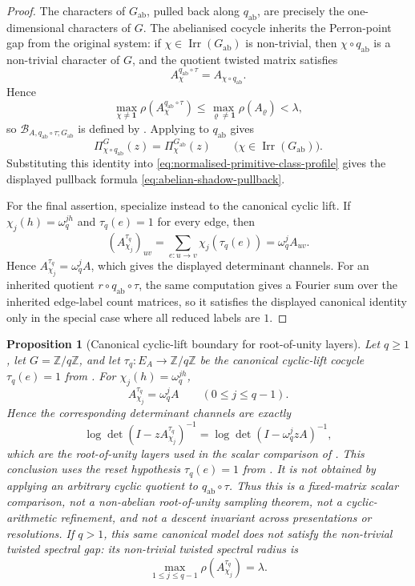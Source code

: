 \documentclass[11pt,a4paper]{amsart}
\theoremstyle{plain}
\newtheorem{proposition}[theorem]{Proposition}
\theoremstyle{definition}
\theoremstyle{remark}
\DeclareMathOperator{\Irr}{Irr}
\newcommand{\ZZ}{\mathbb{Z}}
\begin{document}
\begin{proof}
  The characters of \(G_{\mathrm{ab}}\), pulled back along
  \(q_{\mathrm{ab}}\), are precisely the one-dimensional characters of
  \(G\). The abelianised cocycle inherits the Perron-point gap from the
  original system:
  if \(\chi\in\Irr(G_{\mathrm{ab}})\) is non-trivial, then
  \(\chi\circ q_{\mathrm{ab}}\) is a non-trivial character of \(G\), and
  the quotient twisted matrix satisfies
  \[
    A_{\chi}^{q_{\mathrm{ab}}\circ\tau}
    =
    A_{\chi\circ q_{\mathrm{ab}}}.
  \]
  Hence
  \[
    \max_{\chi\neq\mathbf 1}
      \rho\!\left(A_{\chi}^{q_{\mathrm{ab}}\circ\tau}\right)
    \le
    \max_{\varrho\neq\mathbf 1}\rho(A_\varrho)
    <\lambda,
  \]
  so \(\mathcal B_{A,q_{\mathrm{ab}}\circ\tau;G_{\mathrm{ab}}}\) is
  defined by . Applying
   to \(q_{\mathrm{ab}}\)
  gives
  \[
    \Pi^{G}_{\chi\circ q_{\mathrm{ab}}}(z)
    =
    \Pi^{G_{\mathrm{ab}}}_{\chi}(z)
    \qquad
    \bigl(\chi\in\Irr(G_{\mathrm{ab}})\bigr).
  \]
  Substituting this identity into
  \eqref{eq:normalised-primitive-class-profile} gives the displayed
  pullback formula \eqref{eq:abelian-shadow-pullback}.

  For the final assertion, specialize instead to the canonical cyclic
  lift. If \(\chi_j(h)=\omega_q^{jh}\) and \(\tau_q(e)=1\) for every
  edge, then
  \[
    (A_{\chi_j}^{\tau_q})_{uv}
    =
    \sum_{e:u\to v}\chi_j(\tau_q(e))
    =
    \omega_q^j A_{uv}.
  \]
  Hence \(A_{\chi_j}^{\tau_q}=\omega_q^jA\), which gives the displayed
  determinant channels. For an inherited quotient
  \(r\circ q_{\mathrm{ab}}\circ\tau\), the same computation gives a
  Fourier sum over the inherited edge-label count matrices, so it
  satisfies the displayed canonical identity only in the special case
  where all reduced labels are \(1\).
\end{proof}

\begin{proposition}[Canonical cyclic-lift boundary for root-of-unity layers]
  \label{prop:canonical-cyclic-lift-root-layer}
  Let \(q\ge 1\), let \(G=\ZZ/q\ZZ\), and let
  \(\tau_q:E_A\to\ZZ/q\ZZ\) be the canonical cyclic-lift cocycle
  \(\tau_q(e)=1\) from . For
  \(\chi_j(h)=\omega_q^{jh}\),
  \[
    A_{\chi_j}^{\tau_q}=\omega_q^jA
    \qquad (0\le j\le q-1).
  \]
  Hence the corresponding determinant channels are exactly
  \[
    \log\det(I-zA_{\chi_j}^{\tau_q})^{-1}
    =
    \log\det(I-\omega_q^jzA)^{-1},
  \]
  which are the root-of-unity layers used in the scalar comparison of
  .
  This conclusion uses the reset hypothesis \(\tau_q(e)=1\) from
  . It is not obtained by applying an
  arbitrary cyclic quotient to \(q_{\mathrm{ab}}\circ\tau\). Thus this is a
  fixed-matrix scalar comparison, not a non-abelian root-of-unity sampling
  theorem, not a cyclic-arithmetic refinement, and not a descent invariant
  across presentations or resolutions.
  If \(q>1\), this same canonical model does not satisfy the non-trivial
  twisted spectral gap: its non-trivial twisted spectral radius is
  \[
    \max_{1\le j\le q-1}\rho(A_{\chi_j}^{\tau_q})=\lambda.
  \]
\end{proposition}
\end{document}
